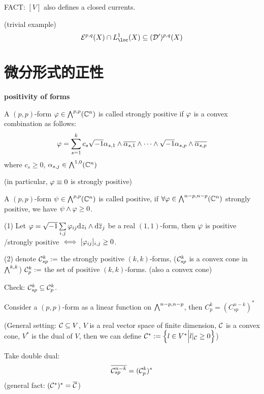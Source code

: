 FACT: $[V]$ also defines a closed currents.

\begin{example}(trivial example)
$$
  \mcalE^{p,q}(X)\cap L^1_{\loc}(X)
  \subseteq(\mcalD')^{p,q}(X)
$$
\end{example}


\section{微分形式的正性}
\textbf{positivity of forms}

\begin{definition}
A $(p,p)$-form $\varphi\in\bigwedge\nolimits^{p,p}(\mathbb{C}^n)$
is called strongly positive if $\varphi$
is a convex combination as follows:
$$
  \varphi
=
  \sum_{s=1}^k
    c_s\sqrt{-1}
    \alpha_{s,1}\wedge\overline{\alpha_{s,1}}
    \wedge\cdots\wedge
    \sqrt{-1}\alpha_{s,p}\wedge\overline{\alpha_{s,p}}
$$
where $c_s\geq 0$, $\alpha_{s,j}\in\bigwedge\nolimits^{1,0}(\mathbb{C}^n)$
\end{definition}
(in particular, $\varphi\equiv0$ is strongly positive)

\begin{definition}
A $(p,p)$-form $\psi\in\bigwedge\nolimits^{p,p}(\mathbb{C}^n)$ is called positive,
if $\forall\varphi\in\bigwedge\nolimits^{n-p,n-p}(\mathbb{C}^n)$ strongly positive,
we have $\psi\wedge\varphi\geq 0$.
\end{definition}

\begin{rem}(1)
Let $\varphi=\sqrt{-1}\sum\limits_{i,j}\varphi_{ij}\mathrm{d} z_i\wedge\mathrm{d}\overline{z}_j$
be a real $(1,1)$-form, then $\varphi$ is positive /strongly positive
$\iff[\varphi_{ij}]_{i,j}\geq 0$.

(2) denote $\mathcal{C}_{sp}^k:=$ the strongly positive $(k,k)$-forms,
($\mathcal{C}_{sp}^k$ is a convex cone in $\bigwedge\nolimits^{k,k}$)
$\mathcal{C}_p^k:=$ the set of positive $(k,k)$-forms.
(also a convex cone)
\end{rem}

Check: $\mathcal{C}_{sp}^k\subseteq\mathcal{C}_p^k$.

Consider a $(p,p)$-form as a linear function on $\bigwedge\nolimits^{n-p,n-p}$,
then $C_p^k=(C_{sp}^{n-k})^*$

(General setting: $\mathcal{C}\subseteq V$, $V$
is a real vector space of finite dimension,
$\mathcal{C}$ is a convex cone, $V^*$ is the dual of $V$, then we can define
$\mathcal{C}^*:=\Big\{ l\in V^* \Big| l|_{\mathcal{C}}\geq 0 \Big\}$)

Take double dual:
$$\overline{\mathcal{C}_{sp}^{n-k}}=(\mathcal{C}_p^k)^*$$
(general fact: $(\mathcal{C}^*)^*=\overline{\mathcal{C}}$)

